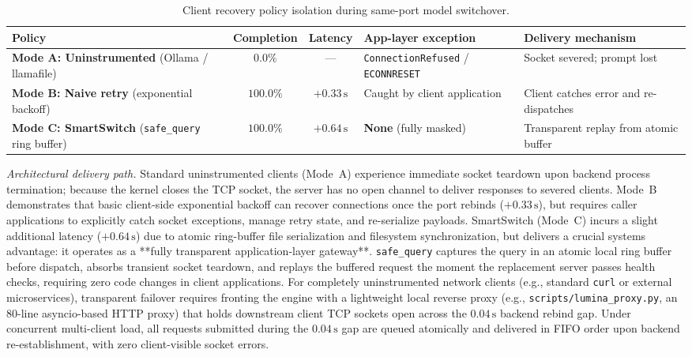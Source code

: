 \documentclass[11pt,a4paper]{article}
\newcommand{\su}{\,\mathrm{s}}
\newcommand{\code}[1]{\texttt{#1}}
\begin{document}
\begin{table}[h]
\centering
\caption{Client recovery policy isolation during same-port model switchover.}\label{tab:isolation}
\small
\begin{tabularx}{\linewidth}{@{}p{3.5cm}cclL@{}}
\toprule
\textbf{Policy} & \textbf{Completion} & \textbf{Latency} & \textbf{App-layer exception} & \textbf{Delivery mechanism} \\
\midrule
\textbf{Mode A: Uninstrumented} (Ollama / llamafile) & $\mathbf{0.0\%}$ & --- & \code{ConnectionRefused} / \code{ECONNRESET} & Socket severed; prompt lost \\
\textbf{Mode B: Naive retry} (exponential backoff) & $\mathbf{100.0\%}$ & $+0.33\su$ & Caught by client application & Client catches error and re-dispatches \\
\textbf{Mode C: SmartSwitch} (\code{safe\_query} ring buffer) & $\mathbf{100.0\%}$ & $+0.64\su$ & \textbf{None} (fully masked) & Transparent replay from atomic buffer \\
\bottomrule
\end{tabularx}
\end{table}

\textit{Architectural delivery path.} Standard uninstrumented clients (Mode~A) experience immediate socket teardown upon backend process termination; because the kernel closes the TCP socket, the server has no open channel to deliver responses to severed clients. Mode~B demonstrates that basic client-side exponential backoff can recover connections once the port rebinds ($+0.33\su$), but requires caller applications to explicitly catch socket exceptions, manage retry state, and re-serialize payloads. SmartSwitch (Mode~C) incurs a slight additional latency ($+0.64\su$) due to atomic ring-buffer file serialization and filesystem synchronization, but delivers a crucial systems advantage: it operates as a **fully transparent application-layer gateway**. \code{safe\_query} captures the query in an atomic local ring buffer before dispatch, absorbs transient socket teardown, and replays the buffered request the moment the replacement server passes health checks, requiring zero code changes in client applications. For completely uninstrumented network clients (e.g., standard \code{curl} or external microservices), transparent failover requires fronting the engine with a lightweight local reverse proxy (e.g., \code{scripts/lumina\_proxy.py}, an 80-line asyncio-based HTTP proxy) that holds downstream client TCP sockets open across the $0.04\su$ backend rebind gap. Under concurrent multi-client load, all requests submitted during the $0.04\su$ gap are queued atomically and delivered in FIFO order upon backend re-establishment, with zero client-visible socket errors.
\end{document}
